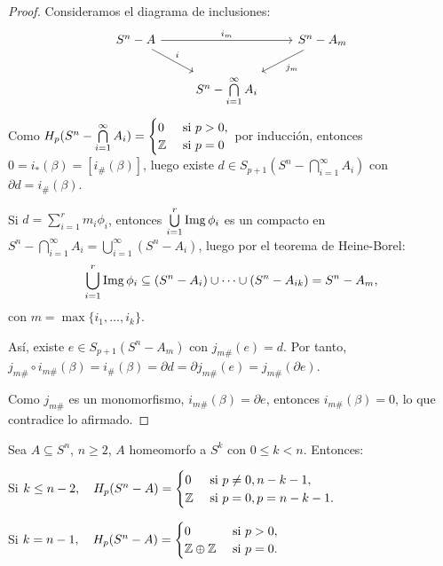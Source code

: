 \begin{proof}
  Consideramos el diagrama de inclusiones:
  \[ \begin{tikzcd}
    S^n - A \arrow{dr}{i} \arrow{rr}{i_m} & & S^n - A_m \arrow{dl}{j_m} \\
    & S^n - \bigcap\limits_{i = 1}^\infty A_i
  \end{tikzcd} \]
  Como $H_p(S^n - \bigcap\limits_{i = 1}^\infty A_i) = \begin{cases} 0 &\text{ si } p > 0, \\ \mathbb{Z} &\text{ si } p = 0 \end{cases}$ por inducción, entonces
  $0 = i_*(\beta) = [i_\#(\beta)]$, luego existe $d \in S_{p+1}(S^n - \bigcap\limits_{i = 1}^\infty A_i)$ con $\partial d = i_\#(\beta)$.

  Si $d = \sum\limits_{i = 1}^r m_i \phi_i$, entonces $\bigcup\limits_{i = 1}^r \operatorname{Img} \phi_i$ es un compacto en $S^n - \bigcap\limits_{i = 1}^\infty A_i
  = \bigcup\limits_{i = 1}^\infty (S^n - A_i)$, luego por el teorema de Heine-Borel:
  \[\bigcup\limits_{i = 1}^r \operatorname{Img} \phi_i \subseteq (S^n - A_i) \cup \dots \cup (S^n - A_{ik}) = S^n - A_m, \]
  con $m = \max\{i_1, \dots, i_k\}$.

  Así, existe $e \in S_{p+1}(S^n - A_m)$ con $j_{m\#}(e) = d$. Por tanto, $j_{m\#} \circ i_{m\#} (\beta) = i_\#(\beta) = \partial d
  = \partial j_{m\#}(e) = j_{m\#}(\partial e)$.

  Como $j_{m\#}$ es un monomorfismo, $i_{m\#}(\beta) = \partial e$, entonces $i_{m\#}(\beta) = 0$, lo que contradice lo afirmado.
\end{proof}

\begin{theorem}
  Sea $A \subseteq S^n$, $n \geq 2$, $A$ homeomorfo a $S^k$ con $0 \leq k < n$. Entonces:

  Si $k \leq n-2, \quad H_p(S^n - A) = \begin{cases} 0 &\text{ si } p \neq 0, n-k-1, \\ \mathbb{Z} &\text{ si } p = 0, p = n-k-1. \end{cases}$

  Si $k = n-1, \quad    H_p(S^n - A) = \begin{cases} 0 &\text{ si } p > 0, \\ \mathbb{Z} \oplus \mathbb{Z} &\text{ si } p = 0. \end{cases}$
\end{theorem}

